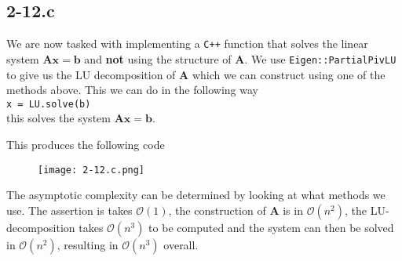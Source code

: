 \documentclass{article}
\begin{document}
\subsection*{2-12.c}
We are now tasked with implementing a \verb|C++| function that solves the linear system $\mathbf{A}\mathbf{x} = \mathbf{b}$ and \textbf{not} using the structure of $\mathbf{A}$. We use \verb|Eigen::PartialPivLU| to give us the LU decomposition of $\mathbf{A}$ which we can construct using one of the methods above. This we can do in the following way \\[2mm]
\verb|x = LU.solve(b)|
\\[1mm]
this solves the system $\mathbf{A}\mathbf{x} = \mathbf{b}$.

\pagebreak

\noindent This produces the following code
\begin{figure}[!hbt]
    \centering
\texttt{[image: 2-12.c.png]}
\end{figure}
The asymptotic complexity can be determined by looking at what methods we use. The assertion is takes $\mathcal{O}\left(1\right)$, the construction of $\mathbf{A}$ is in $\mathcal{O}\left(n^{2}\right)$, the LU-decomposition takes $\mathcal{O}\left(n^{3}\right)$ to be computed and the system can then be solved in $\mathcal{O}\left(n^{2}\right)$, resulting in $\mathcal{O}\left(n^{3}\right)$ overall.
\end{document}

